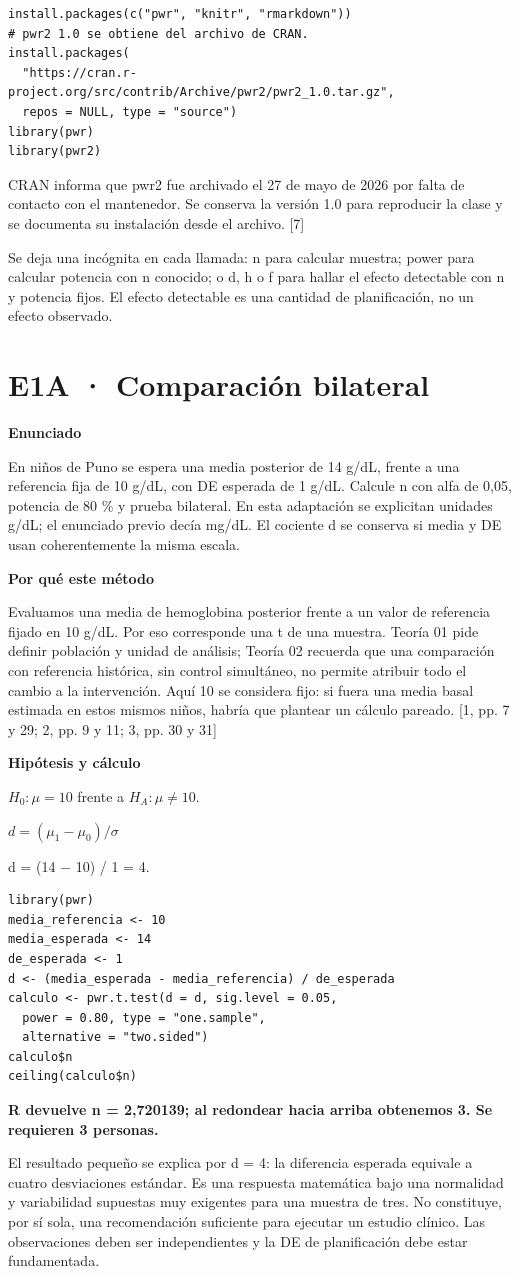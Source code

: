\documentclass[10pt,a4paper]{article}
\newcommand{\etiqueta}[1]{\par{\bfseries\color{Blue}#1}\par}
\newcommand{\cajares}[1]{\par\colorbox{Pale}{\parbox{\dimexpr\linewidth-2\fboxsep}{\vspace{4pt}\textbf{\color{Navy}#1}\vspace{4pt}}}\par}
\begin{document}
\begin{Verbatim}
install.packages(c("pwr", "knitr", "rmarkdown"))
# pwr2 1.0 se obtiene del archivo de CRAN.
install.packages(
  "https://cran.r-project.org/src/contrib/Archive/pwr2/pwr2_1.0.tar.gz",
  repos = NULL, type = "source")
library(pwr)
library(pwr2)
\end{Verbatim}

CRAN informa que pwr2 fue archivado el 27 de mayo de 2026 por falta de contacto con el mantenedor. Se conserva la versión 1.0 para reproducir la clase y se documenta su instalación desde el archivo. [7]

Se deja una incógnita en cada llamada: n para calcular muestra; power para calcular potencia con n conocido; o d, h o f para hallar el efecto detectable con n y potencia fijos. El efecto detectable es una cantidad de planificación, no un efecto observado.



\clearpage
\section*{E1A · Comparación bilateral}
\etiqueta{Enunciado}
En niños de Puno se espera una media posterior de 14 g/dL, frente a una referencia fija de 10 g/dL, con DE esperada de 1 g/dL. Calcule n con alfa de 0,05, potencia de 80 \% y prueba bilateral. En esta adaptación se explicitan unidades g/dL; el enunciado previo decía mg/dL. El cociente d se conserva si media y DE usan coherentemente la misma escala.
\etiqueta{Por qué este método}
Evaluamos una media de hemoglobina posterior frente a un valor de referencia fijado en 10 g/dL. Por eso corresponde una t de una muestra. Teoría 01 pide definir población y unidad de análisis; Teoría 02 recuerda que una comparación con referencia histórica, sin control simultáneo, no permite atribuir todo el cambio a la intervención. Aquí 10 se considera fijo: si fuera una media basal estimada en estos mismos niños, habría que plantear un cálculo pareado. [1, pp. 7 y 29; 2, pp. 9 y 11; 3, pp. 30 y 31]
\etiqueta{Hipótesis y cálculo}
$H_0: \mu=10$ frente a $H_A: \mu\ne10$.

$d=(\mu_1-\mu_0)/\sigma$

d = (14 \ensuremath{-} 10) / 1 = 4.
\begin{Verbatim}
library(pwr)
media_referencia <- 10
media_esperada <- 14
de_esperada <- 1
d <- (media_esperada - media_referencia) / de_esperada
calculo <- pwr.t.test(d = d, sig.level = 0.05,
  power = 0.80, type = "one.sample",
  alternative = "two.sided")
calculo$n
ceiling(calculo$n)
\end{Verbatim}
\cajares{R devuelve n = 2,720139; al redondear hacia arriba obtenemos 3. Se requieren 3 personas.}
El resultado pequeño se explica por d = 4: la diferencia esperada equivale a cuatro desviaciones estándar. Es una respuesta matemática bajo una normalidad y variabilidad supuestas muy exigentes para una muestra de tres. No constituye, por sí sola, una recomendación suficiente para ejecutar un estudio clínico. Las observaciones deben ser independientes y la DE de planificación debe estar fundamentada.
\end{document}
